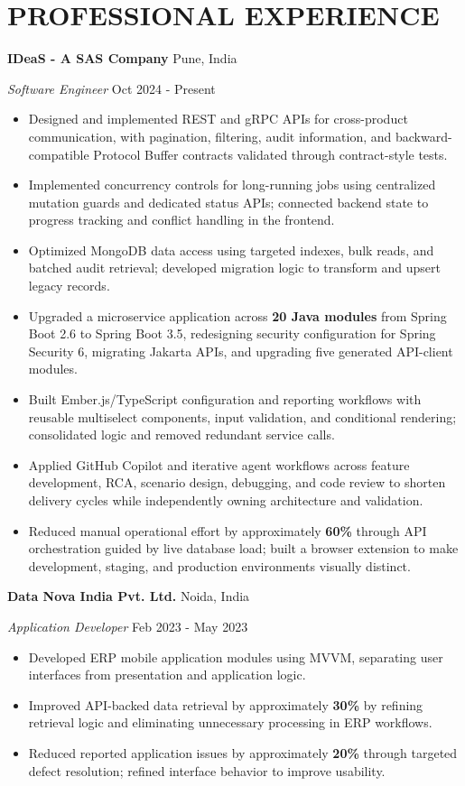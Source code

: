 \documentclass[a4paper,10pt]{article}
\begin{document}
\section{PROFESSIONAL EXPERIENCE}
\textbf{IDeaS - A SAS Company} \hfill Pune, India\par
\textit{Software Engineer} \hfill Oct 2024 - Present\par
\begin{itemize}
\item Designed and implemented REST and gRPC APIs for cross-product communication, with pagination, filtering, audit information, and backward-compatible Protocol Buffer contracts validated through contract-style tests.
\item Implemented concurrency controls for long-running jobs using centralized mutation guards and dedicated status APIs; connected backend state to progress tracking and conflict handling in the frontend.
\item Optimized MongoDB data access using targeted indexes, bulk reads, and batched audit retrieval; developed migration logic to transform and upsert legacy records.
\item Upgraded a microservice application across \textbf{20 Java modules} from Spring Boot 2.6 to Spring Boot 3.5, redesigning security configuration for Spring Security 6, migrating Jakarta APIs, and upgrading five generated API-client modules.
\item Built Ember.js/TypeScript configuration and reporting workflows with reusable multiselect components, input validation, and conditional rendering; consolidated logic and removed redundant service calls.
\item Applied GitHub Copilot and iterative agent workflows across feature development, RCA, scenario design, debugging, and code review to shorten delivery cycles while independently owning architecture and validation.
\item Reduced manual operational effort by approximately \textbf{60\%} through API orchestration guided by live database load; built a browser extension to make development, staging, and production environments visually distinct.
\end{itemize}
\vspace{3pt}
\textbf{Data Nova India Pvt. Ltd.} \hfill Noida, India\par
\textit{Application Developer} \hfill Feb 2023 - May 2023\par
\begin{itemize}
\item Developed ERP mobile application modules using MVVM, separating user interfaces from presentation and application logic.
\item Improved API-backed data retrieval by approximately \textbf{30\%} by refining retrieval logic and eliminating unnecessary processing in ERP workflows.
\item Reduced reported application issues by approximately \textbf{20\%} through targeted defect resolution; refined interface behavior to improve usability.
\end{itemize}
\end{document}
